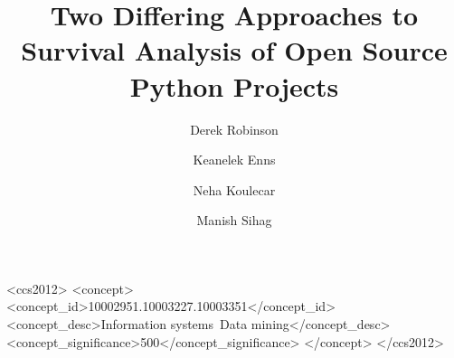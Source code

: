 \documentclass[acmconf]{acmart}
\begin{document}


\title[Survival Analysis of Open Source Projects]{Two Differing Approaches to Survival Analysis of Open Source Python Projects}

\author{Derek Robinson}
\author{Keanelek Enns}
\author{Neha Koulecar}
\author{Manish Sihag}

\renewcommand{\shortauthors}{D. Robinson, K. Enns, N. Koulecar, M. Sihag}

\begin{abstract}
\end{abstract}

\begin{CCSXML}
<ccs2012>
<concept>
<concept_id>10002951.10003227.10003351</concept_id>
<concept_desc>Information systems~Data mining</concept_desc>
<concept_significance>500</concept_significance>
</concept>
</ccs2012>
\end{CCSXML}


\end{document}
